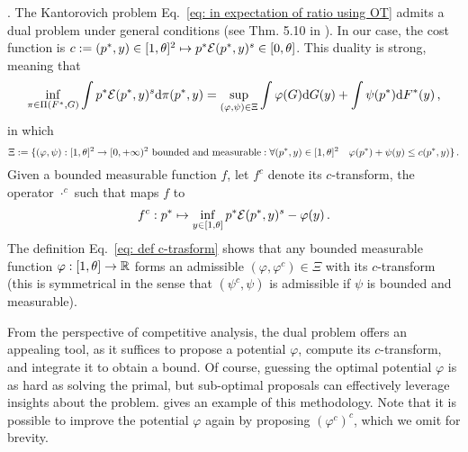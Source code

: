 . The Kantorovich problem Eq.~\eqref{eq: in expectation of ratio using OT} admits a dual problem under general conditions (see \eg Thm. 5.10 in  \cite{villani_optimal_2009}). In our case, the cost function is $c:= (p^*,y)\in[1,\theta]^2\mapsto p^*\mathcal{E}(p^*,y)^{s}\in[0,\theta]$.  This duality is strong, meaning that 
\begin{align}
    \inf_{\pi\in\Pi(F^*,G)}\int p^*\mathcal{E}(p^*,y)^{s}\mathrm{d}\pi(p^*,y) = \sup_{(\varphi,\psi)\in\Xi}\int \varphi(G)\mathrm{d}G(y) + \int \psi(p^*)\mathrm{d}F^*(y)\,,\label{eq: dual problem OT}
\end{align}
in which 
\[
    \Xi:=\{(\varphi,\psi):[1,\theta]^2\to[0,+\infty)^2 \mbox{ bounded and measurable}: \forall(p^*,y)\in[1,\theta]^2\quad \varphi(p^*)+\psi(y)\le c(p^*,y) \}\,.
\]
Given a bounded measurable function $f$, let $f^c$ denote its $c$-transform, \ie the operator $\cdot^c$ such that maps $f$ to
\begin{align}
    f^c:p^*\mapsto \inf_{y\in[1,\theta]} p^*\mathcal{E}(p^*,y)^{s} - \varphi(y)\,.\label{eq: def c-trasform}
\end{align}
The definition Eq.~\eqref{eq: def c-trasform} shows that any bounded measurable function $\varphi:[1,\theta]\to\mathbb{R}$ forms an admissible $(\varphi,\varphi^c)\in\Xi$ with its $c$-transform (this is symmetrical in the sense that $(\psi^c,\psi)$ is admissible if $\psi$ is bounded and measurable).

From the perspective of competitive analysis, the dual problem offers an appealing tool, as it suffices to propose a potential $\varphi$, compute its $c$-transform, and integrate it to obtain a bound. Of course, guessing the optimal potential $\varphi$ is as hard as solving the primal, but sub-optimal proposals can effectively leverage insights about the problem.  gives an example of this methodology. Note that it is possible to improve the potential $\varphi$ again by proposing ${(\varphi^c)}^c$, which we omit for brevity. 

\OTdualBoundsOne*

